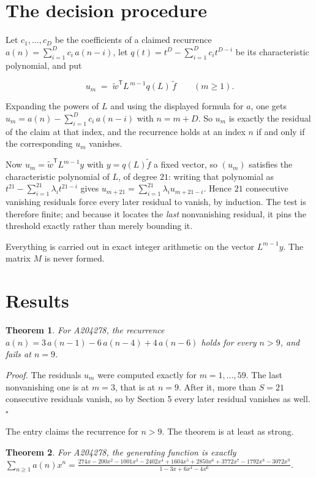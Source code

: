 \documentclass[11pt]{article}
\newtheorem{theorem}{Theorem}
\theoremstyle{definition}
\begin{document}
\section{The decision procedure}

Let $c_1,\dots,c_D$ be the coefficients of a claimed recurrence $a(n) = \sum_{i=1}^{D} c_i\,a(n-i)$, let $q(t) = t^{D} - \sum_{i=1}^{D} c_i t^{D-i}$ be its characteristic polynomial, and put

\[u_m \;=\; \tilde w^{\mathsf T} L^{\,m-1} q(L)\,\tilde f \qquad (m \ge 1).\]

Expanding the powers of $L$ and using the displayed formula for $a$, one gets $u_m = a(n) - \sum_{i=1}^{D} c_i\,a(n-i)$ with $n = m + D$. So $u_m$ is exactly the residual of the claim at that index, and the recurrence holds at an index $n$ if and only if the corresponding $u_m$ vanishes.

Now $u_m = \tilde w^{\mathsf T} L^{m-1} y$ with $y = q(L)\tilde f$ a fixed vector, so $(u_m)$ satisfies the characteristic polynomial of $L$, of degree $21$: writing that polynomial as $t^{21} - \sum_{i=1}^{21} \lambda_i t^{21-i}$ gives $u_{m+21} = \sum_{i=1}^{21} \lambda_i u_{m+21-i}$. Hence $21$ consecutive vanishing residuals force every later residual to vanish, by induction. The test is therefore finite; and because it locates the {\itshape last} nonvanishing residual, it pins the threshold exactly rather than merely bounding it.

Everything is carried out in exact integer arithmetic on the vector $L^{m-1}y$. The matrix $M$ is never formed.

\section{Results}

\begin{theorem} For A204278, the recurrence $a(n) = 3\,a(n-1) - 6\,a(n-4) + 4\,a(n-6)$ holds for every $n > 9$, and fails at $n = 9$.\end{theorem}

{\itshape Proof.} The residuals $u_m$ were computed exactly for $m = 1,\dots,59$. The last nonvanishing one is at $m = 3$, that is at $n = 9$. After it, more than $S = 21$ consecutive residuals vanish, so by Section 5 every later residual vanishes as well. $\square$

The entry claims the recurrence for $n > 9$. The theorem is at least as strong.

\begin{theorem} For A204278, the generating function is exactly $\sum_{n\ge 1} a(n)x^n = \frac{274x - 200x^{2} - 1001x^{3} - 2402x^{4} + 1604x^{5} + 2850x^{6} + 3772x^{7} - 1792x^{8} - 3072x^{9}}{1 - 3x + 6x^{4} - 4x^{6}}$.\end{theorem}
\end{document}
